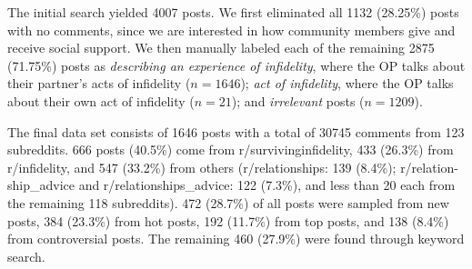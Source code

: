 


The initial search yielded 4007 posts. We first eliminated all 1132 (28.25\%) posts with no comments, since we are interested in how community members give and receive social support. We then manually labeled each of the remaining 2875 (71.75\%) posts as \textit{describing an experience of infidelity}, where the OP talks about their partner's acts of infidelity ($n=1646$); \textit{act of infidelity}, where the OP talks about their own act of infidelity ($n=21$); and \textit{irrelevant} posts ($n=1209$).  



The final data set consists of 1646 posts with a total of 30745 comments from 123 subreddits. 666 posts (40.5\%) come from r/survivinginfidelity,  433 (26.3\%) from r/infidelity, and 547 (33.2\%) from others (r/relationships: 139 (8.4\%); r/relation-ship\_advice and r/relationships\_advice: 122 (7.3\%), and less than 20 each from the remaining 118 subreddits). 472 (28.7\%) of all posts were sampled from new posts, 384 (23.3\%) from hot posts, 192 (11.7\%) from top posts, and 138 (8.4\%) from controversial posts. The remaining 460 (27.9\%) were found through keyword search. 




